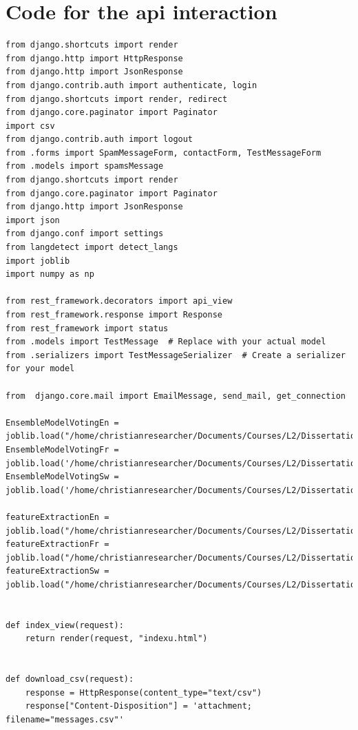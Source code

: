 \documentclass[12pt,a4paper, oneside]{book}
\begin{document}
\section{Code for the api interaction}
\begin{lstlisting}[style=stylejupyter]
from django.shortcuts import render
from django.http import HttpResponse
from django.http import JsonResponse
from django.contrib.auth import authenticate, login
from django.shortcuts import render, redirect
from django.core.paginator import Paginator
import csv
from django.contrib.auth import logout
from .forms import SpamMessageForm, contactForm, TestMessageForm
from .models import spamsMessage 
from django.shortcuts import render
from django.core.paginator import Paginator
from django.http import JsonResponse
import json
from django.conf import settings
from langdetect import detect_langs 
import joblib 
import numpy as np

from rest_framework.decorators import api_view
from rest_framework.response import Response
from rest_framework import status
from .models import TestMessage  # Replace with your actual model
from .serializers import TestMessageSerializer  # Create a serializer for your model

from  django.core.mail import EmailMessage, send_mail, get_connection

EnsembleModelVotingEn = joblib.load("/home/christianresearcher/Documents/Courses/L2/Dissertation/spamDetectionApp/project/static/models/EnglishModelPrediction.pkl")
EnsembleModelVotingFr = joblib.load('/home/christianresearcher/Documents/Courses/L2/Dissertation/spamDetectionApp/project/static/models/FrenchModelPrediction.pkl')
EnsembleModelVotingSw = joblib.load('/home/christianresearcher/Documents/Courses/L2/Dissertation/spamDetectionApp/project/static/models/SwahiliModelPrediction.pkl')

featureExtractionEn = joblib.load("/home/christianresearcher/Documents/Courses/L2/Dissertation/spamDetectionApp/project/static/models/EnglishFeatureModel.pkl") 
featureExtractionFr = joblib.load("/home/christianresearcher/Documents/Courses/L2/Dissertation/spamDetectionApp/project/static/models/FrenchFeatureModel.pkl")
featureExtractionSw = joblib.load("/home/christianresearcher/Documents/Courses/L2/Dissertation/spamDetectionApp/project/static/models/SwahiliFeatureModel.pkl")


def index_view(request):
	return render(request, "indexu.html")


def download_csv(request):
	response = HttpResponse(content_type="text/csv")
	response["Content-Disposition"] = 'attachment; filename="messages.csv"'
	

\end{lstlisting}
\end{document}
